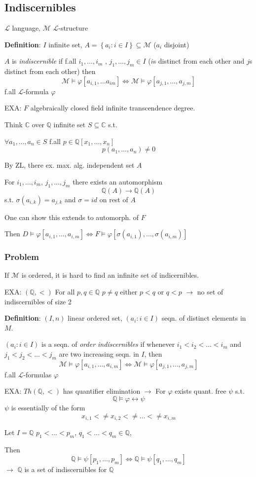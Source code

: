 \documentclass[12pt]{article}
\newcommand{\Rat}{\ensuremath{\mathbb{Q}}}
\newcommand{\Comp}{\ensuremath{\mathbb{C}}}
\newcommand{\defn}{\textbf{Definition}: }
\begin{document}
\subsection{Indiscernibles}

$\mathcal{L}$ language, $\mathcal{M}$ $\mathcal{L}$-structure

\defn $I$ infinite set, $A = \left\{ a_i : i \in I \right\} \subseteq \mathcal{M}$
($a_i$ disjoint)

$A$ is \emph{indiscernible} if f.all $i_1,\dots,i_m$ , $j_1, \dots, j_m \in I$
($i$s distinct from each other and $j$s distinct from each other)
then 
\[
\mathcal{M} \models \varphi\left[ a_{i,1}, \dots a_{im}\right] 
\Leftrightarrow \mathcal{M} \models \varphi\left[ a_{j,1}, \dots, a_{j,m} \right]
\]
f.all $\mathcal{L}$-formula $\varphi$

EXA: $F$ algebraically closed field infinite transcendence degree.

Think $\Comp$ over $\Rat$
infinite set $S \subseteq \Comp$ s.t.

$\forall a_1, \dots, a_n \in S$ f.all $p \in \Rat[x_1, \dots, x_n]$
\[
p(a_1, \dots, a_n) \ne 0
\]

By ZL, there ex. max. alg. independent set $A$

For $i_1, \dots, i_m$, $j_1, \dots, j_m$ there exists an automorphism
\[
\Rat(A) \rightarrow \Rat(A)
\]
s.t. 
$\sigma(a_{i,k}) = a_{j,k}$ and 
$\sigma = id$ on rest of $A$

One can show this extends to automorph. of $F$

Then $D \models \varphi[a_{i,1}, \dots, a_{i,m}] \Leftrightarrow F \models \varphi[\sigma(a_{i,1}), \dots, \sigma(a_{i,m})]$

\subsubsection*{Problem}
If $\mathcal{M}$ is ordered, it is hard to find an infinite set of indicernibles.

EXA: $(\Rat, <)$ For all $p,q \in \Rat$ $p \ne q$ either $p < q$ or $q < p$
$\rightarrow$ no set of indiscernibles of size 2


\defn
$(I, n)$ linear ordered set, $(a_i : i \in I)$ seqn. of distinct elements in $M$.

$(a_i : i \in I)$ is a seqn. of \emph{order indiscernibles}
if whenever $i_1 < i_2 < \dots < i_m$ and $j_1 < j_2 < \dots < j_m$
are two increasing seqn. in $I$, then
\[
\mathcal{M} \models \varphi[a_{i,1}, \dots, a_{i,m}]
\Leftrightarrow
\mathcal{M} \models \varphi[a_{j,1}, \dots, a_{j,m}]
\]
f.all $\mathcal{L}$-formulas $\varphi$

EXA: $Th(\Rat, <)$ has quantifier elimination
$\rightarrow$ For $\varphi$ exists quant. free $\psi$ s.t.
\[
\Rat \models \varphi \leftrightarrow \psi
\]
$\psi$ is essentially of the form
\[
x_{i,1} <\not=
x_{i,2} <\not=
\dots <\not=
x_{i,m}
\]

Let $I = \Rat$ 
$p_1 < \dots < p_m$,
$q_1 < \dots < q_m \in \Rat$,

Then
\[
\Rat \models \psi[p_1, \dots, p_m] \Leftrightarrow
\Rat \models \psi[q_1, \dots, q_m]
\]
$\rightarrow$ $\Rat$ is a set of indiscernibles for $\Rat$
\end{document}
